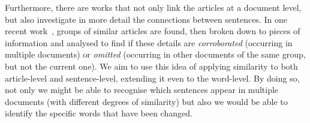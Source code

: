 



Furthermore, there are works that not only link the articles at a document level, but also investigate in more detail the connections between sentences.
In one recent work~\cite{bountouridis2018explaining}, groups of similar articles are found, then broken down to pieces of information and analysed to find if these details are \emph{corroborated} (occurring in multiple documents) or \emph{omitted} (occurring in other documents of the same group, but not the current one). 
We aim to use this idea of applying similarity to both article-level and sentence-level, extending it even to the word-level. By doing so,
not only we might be able to recognise which sentences appear in multiple documents (with different degrees of similarity) but also we would be able to identify the specific words that have been changed.

